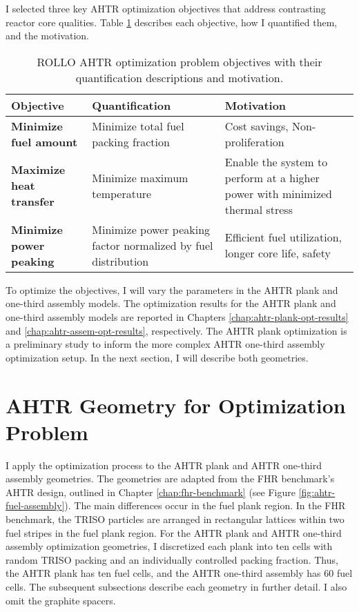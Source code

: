 I selected three key \gls{AHTR} optimization objectives that address contrasting reactor 
core qualities. 
Table \ref{tab:objectives} describes each objective, how I quantified them, and the motivation.
\begin{table}[htbp]
    \centering
    \onehalfspacing
    \caption{\acrfull{ROLLO} \acrfull{AHTR} optimization problem objectives with 
    their quantification descriptions and motivation.}
	\label{tab:objectives}
    \footnotesize
    \begin{tabular}{p{4.5cm}|p{5cm}p{5cm}}
    \hline 
    \textbf{Objective}& \textbf{Quantification}& \textbf{Motivation} \\
    \hline
    \textbf{Minimize fuel amount} & Minimize total fuel packing fraction 
    & Cost savings, Non-proliferation \\ 
    \hline
    \textbf{Maximize heat transfer} & Minimize maximum temperature 
    & Enable the system to perform at a higher power with minimized thermal stress \\
    \hline
    \textbf{Minimize power peaking} & Minimize power peaking factor normalized by fuel distribution 
    & Efficient fuel utilization, longer core life, safety\\
    \hline
    \end{tabular}
\end{table}

To optimize the objectives, I will vary the parameters in the \gls{AHTR} plank and 
one-third assembly models. 
The optimization results for the \gls{AHTR} plank and one-third assembly models are 
reported in Chapters \ref{chap:ahtr-plank-opt-results} and \ref{chap:ahtr-assem-opt-results}, 
respectively. 
The \gls{AHTR} plank optimization is a preliminary study to inform the more complex 
\gls{AHTR} one-third assembly optimization setup. 
In the next section, I will describe both geometries. 

\section{AHTR Geometry for Optimization Problem}
\label{sec:ahtr-geometry}
I apply the optimization process to the \gls{AHTR} plank and \gls{AHTR} one-third
assembly geometries.
The geometries are adapted from the \gls{FHR} benchmark's \gls{AHTR} design,
outlined in Chapter \ref{chap:fhr-benchmark} (see Figure \ref{fig:ahtr-fuel-assembly}).
The main differences occur in the fuel plank region. 
In the \gls{FHR} benchmark, the TRISO particles are arranged in rectangular lattices 
within two fuel stripes in the fuel plank region. 
For the \gls{AHTR} plank and \gls{AHTR} one-third assembly optimization geometries, 
I discretized each plank into ten cells with random TRISO packing and an individually 
controlled packing fraction. 
Thus, the \gls{AHTR} plank has ten fuel cells, and the \gls{AHTR} one-third assembly 
has 60 fuel cells.  
The subsequent subsections describe each geometry in further detail.
I also omit the graphite spacers. 

